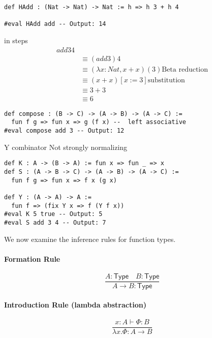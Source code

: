 \begin{example}
  \begin{lstlisting}[language=Lean]
def HAdd : (Nat -> Nat) -> Nat := h => h 3 + h 4

#eval HAdd add -- Output: 14

\end{lstlisting}
  in steps
  \begin{align}
    add 3 4                                                     \\
     & \equiv (add 3) 4                                         \\
     & \equiv (\lambda x : Nat, x + x)(3) \text{Beta reduction} \\
     & \equiv (x + x) [x:= 3] \text{substitution}               \\
     & \equiv 3 + 3                                             \\
     & \equiv 6
  \end{align}
\end{example}
\begin{example}
  \begin{lstlisting}[language=Lean]
def compose : (B -> C) -> (A -> B) -> (A -> C) :=
  fun f g => fun x => g (f x) --  left associative 
#eval compose add 3 -- Output: 12
\end{lstlisting}
\end{example}
\newpage
Y combinator Not strongly normalizing
\begin{example}
  \begin{lstlisting}[language=Lean]
def K : A -> (B -> A) := fun x => fun _ => x  
def S : (A -> B -> C) -> (A -> B) -> (A -> C) :=
  fun f g => fun x => f x (g x)

def Y : (A -> A) -> A := 
  fun f => (fix Y x => f (Y f x))
#eval K 5 true -- Output: 5 
#eval S add 3 4 -- Output: 7
\end{lstlisting}
\end{example}
We now examine the inference rules for function types.
\paragraph{Formation Rule}
\[
  \frac{A : \mathsf{Type} \quad B : \mathsf{Type}}{A \to B : \mathsf{Type}}
\]

\paragraph{Introduction Rule (lambda abstraction)}
\[
  \frac{x : A \vdash \Phi : B}{\lambda x.\Phi : A \to B}
\]

